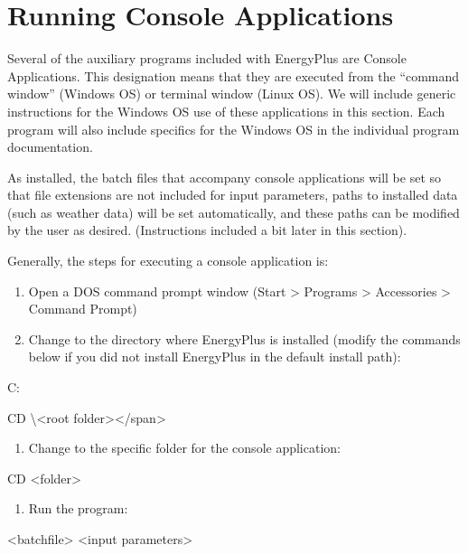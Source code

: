 \chapter{Running Console Applications}\label{running-console-applications}

Several of the auxiliary programs included with EnergyPlus are Console Applications. This designation means that they are executed from the ``command window'' (Windows OS) or terminal window (Linux OS). We will include generic instructions for the Windows OS use of these applications in this section. Each program will also include specifics for the Windows OS in the individual program documentation.

As installed, the batch files that accompany console applications will be set so that file extensions are not included for input parameters, paths to installed data (such as weather data) will be set automatically, and these paths can be modified by the user as desired. (Instructions included a bit later in this section).

Generally, the steps for executing a console application is:

\begin{enumerate}
\def\labelenumi{\arabic{enumi})}
\item
  Open a DOS command prompt window (Start > Programs > Accessories > Command Prompt)
\item
  Change to the directory where EnergyPlus is installed (modify the commands below if you did not install EnergyPlus in the default install path):
\end{enumerate}

C:

CD \textbackslash{}\textless{}root folder\textgreater{}\textless{}/span\textgreater{}

\begin{enumerate}
\def\labelenumi{\arabic{enumi})}
\setcounter{enumi}{2}
\tightlist
\item
  Change to the specific folder for the console application:
\end{enumerate}

CD \textless{}folder\textgreater{}

\begin{enumerate}
\def\labelenumi{\arabic{enumi})}
\setcounter{enumi}{3}
\tightlist
\item
  Run the program:
\end{enumerate}

\textless{}batchfile\textgreater{} \textless{}input parameters\textgreater{}
